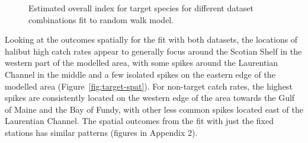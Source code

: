 \documentclass[12pt]{article}\usepackage[]{graphicx}\usepackage[]{color}
\begin{document}
\begin{figure}[htb]

{\centering {}  

}

\caption{Estimated overall index for target species for different dataset combinations fit to random walk model.}\label{fig:non-t-indices}
\end{figure}
Looking at the outcomes spatially for the fit with both datasets, the locations of halibut high catch rates appear to generally focus around the Scotian Shelf in the western part of the modelled area, with some spikes around the Laurentian Channel in the middle and a few isolated spikes on the eastern edge of the modelled area (Figure~\ref{fig:target-spat}). For non-target catch rates, the highest spikes are consistently located on the western edge of the area towards the Gulf of Maine and the Bay of Fundy, with other less common spikes located east of the Laurentian Channel. The spatial outcomes from the fit with just the fixed stations has similar patterns (figures in Appendix 2).
\end{document}
